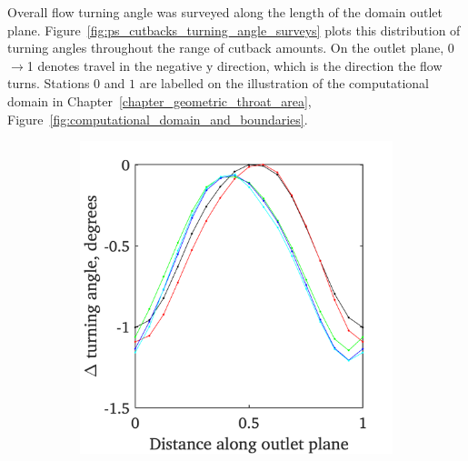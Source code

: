 \documentclass[a4paper, 11pt, oneside]{report}
\begin{document}
Overall flow turning angle was surveyed along the length of the domain outlet plane. Figure~\ref{fig:ps_cutbacks_turning_angle_surveys} plots this distribution of turning angles throughout the range of cutback amounts. On the outlet plane, 0$\rightarrow$1 denotes travel in the negative y direction, which is the direction the flow turns. Stations $0$ and $1$ are labelled on the illustration of the computational domain in Chapter~\ref{chapter_geometric_throat_area}, Figure~\ref{fig:computational_domain_and_boundaries}.

\begin{figure}[H]
	\centering
	\begin{subfigure}{.45\textwidth}
		\centering
		\includegraphics[width=\linewidth]{figs/ps_cutbacks_turning_angle_surveys.png}
	\end{subfigure}
	\begin{subfigure}{.1125\textwidth}
		\centering

\end{subfigure}
\end{figure}
\end{document}
